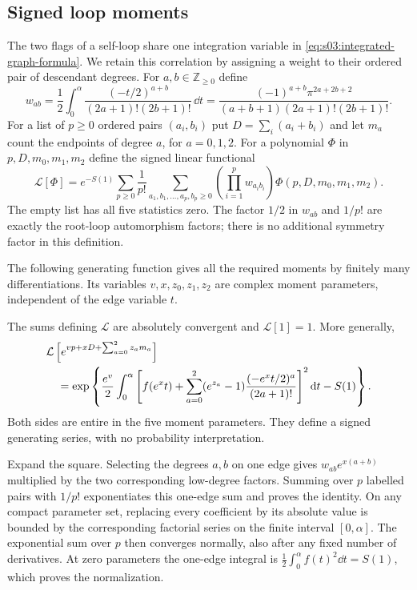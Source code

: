 \subsection{Signed loop moments}
\label{subsec:a:02}

The two flags of a self-loop share one integration variable in
\eqref{eq:s03:integrated-graph-formula}. We retain this correlation by
assigning a weight to their ordered pair of descendant degrees. For
$a,b\in\mathbb Z_{\geq0}$ define
\begin{equation}\label{eq:a:paired-weight}
 w_{ab}=\frac12\int_0^{\alpha}
       \frac{(-t/2)^{a+b}}{(2a+1)!(2b+1)!}\,\dd t
 =\frac{(-1)^{a+b}\pi^{2a+2b+2}}
 {(a+b+1)(2a+1)!(2b+1)!}.
\end{equation}
For a list of $p\geq0$ ordered pairs $(a_i,b_i)$ put
$D=\sum_i(a_i+b_i)$ and let $m_a$ count the endpoints of degree $a$,
for $a=0,1,2$. For a polynomial $\Phi$ in $p,D,m_0,m_1,m_2$ define
the signed linear functional
\begin{equation}\label{eq:a:signed-functional}
 \mathcal L[\Phi]=e^{-S(1)}\sum_{p\geq0}\frac1{p!}
 \sum_{a_1,b_1,\ldots,a_p,b_p\geq0}
       \left(\prod_{i=1}^p w_{a_i b_i}\right)
       \Phi(p,D,m_0,m_1,m_2).
\end{equation}
The empty list has all five statistics zero. The factor $1/2$ in
$w_{ab}$ and $1/p!$ are exactly the root-loop automorphism factors;
there is no additional symmetry factor in this definition.

The following generating function gives all the required moments by
finitely many differentiations. Its variables $v,x,z_0,z_1,z_2$ are
complex moment parameters, independent of the edge variable $t$.

\begin{lmm}\label{lmm:a:joint-moments}
The sums defining $\mathcal L$ are absolutely convergent and
$\mathcal L[1]=1$. More generally,
\begin{align}
 &\mathcal L\left[e^{vp+xD+\sum_{a=0}^2z_a m_a}\right]\notag\\
 &\quad=\exp\left\{\frac{e^v}{2}\int_0^\alpha
 \left[f(e^x t)+\sum_{a=0}^2(e^{z_a}-1)
               \frac{(-e^x t/2)^a}{(2a+1)!}\right]^2\mathrm{d} t-S(1)\right\}.
 \label{eq:a:joint-egf}
\end{align}
Both sides are entire in the five moment parameters. They define a
signed generating series, with no probability interpretation.
\end{lmm}
\begin{prf}
Expand the square. Selecting the degrees $a,b$ on one edge gives
$w_{ab}e^{x(a+b)}$ multiplied by the two corresponding low-degree
factors. Summing over $p$ labelled pairs with $1/p!$ exponentiates
this one-edge sum and proves the identity. On any compact parameter
set, replacing every coefficient by its absolute value is bounded by
the corresponding factorial series on the finite interval
$[0,\alpha]$. The exponential sum over $p$ then converges normally,
also after any fixed number of derivatives. At zero parameters the
one-edge integral is $\tfrac12\int_0^\alpha f(t)^2\dd t=S(1)$,
which proves the normalization.
\end{prf}

